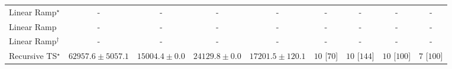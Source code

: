 \begin{tabular}{l|cccc|cccc|}
Linear Ramp$^\star$ & {\cellcolor[HTML]{000000}} \color[HTML]{F1F1F1} {\cellcolor{white}} \color{black} - & {\cellcolor[HTML]{000000}} \color[HTML]{F1F1F1} {\cellcolor{white}} \color{black} - & {\cellcolor[HTML]{000000}} \color[HTML]{F1F1F1} {\cellcolor{white}} \color{black} - & {\cellcolor[HTML]{000000}} \color[HTML]{F1F1F1} {\cellcolor{white}} \color{black} - & {\cellcolor[HTML]{000000}} \color[HTML]{F1F1F1} {\cellcolor{white}} \color{black} - & {\cellcolor[HTML]{000000}} \color[HTML]{F1F1F1} {\cellcolor{white}} \color{black} - & {\cellcolor[HTML]{000000}} \color[HTML]{F1F1F1} {\cellcolor{white}} \color{black} - & {\cellcolor[HTML]{000000}} \color[HTML]{F1F1F1} {\cellcolor{white}} \color{black} - \\
Linear Ramp & {\cellcolor[HTML]{000000}} \color[HTML]{F1F1F1} {\cellcolor{white}} \color{black} - & {\cellcolor[HTML]{000000}} \color[HTML]{F1F1F1} {\cellcolor{white}} \color{black} - & {\cellcolor[HTML]{000000}} \color[HTML]{F1F1F1} {\cellcolor{white}} \color{black} - & {\cellcolor[HTML]{000000}} \color[HTML]{F1F1F1} {\cellcolor{white}} \color{black} - & {\cellcolor[HTML]{000000}} \color[HTML]{F1F1F1} {\cellcolor{white}} \color{black} - & {\cellcolor[HTML]{000000}} \color[HTML]{F1F1F1} {\cellcolor{white}} \color{black} - & {\cellcolor[HTML]{000000}} \color[HTML]{F1F1F1} {\cellcolor{white}} \color{black} - & {\cellcolor[HTML]{000000}} \color[HTML]{F1F1F1} {\cellcolor{white}} \color{black} - \\
Linear Ramp$^\dagger$ & {\cellcolor[HTML]{000000}} \color[HTML]{F1F1F1} {\cellcolor{white}} \color{black} - & {\cellcolor[HTML]{000000}} \color[HTML]{F1F1F1} {\cellcolor{white}} \color{black} - & {\cellcolor[HTML]{000000}} \color[HTML]{F1F1F1} {\cellcolor{white}} \color{black} - & {\cellcolor[HTML]{000000}} \color[HTML]{F1F1F1} {\cellcolor{white}} \color{black} - & {\cellcolor[HTML]{000000}} \color[HTML]{F1F1F1} {\cellcolor{white}} \color{black} - & {\cellcolor[HTML]{000000}} \color[HTML]{F1F1F1} {\cellcolor{white}} \color{black} - & {\cellcolor[HTML]{000000}} \color[HTML]{F1F1F1} {\cellcolor{white}} \color{black} - & {\cellcolor[HTML]{000000}} \color[HTML]{F1F1F1} {\cellcolor{white}} \color{black} - \\
Recursive TS$^\star$ & {\cellcolor[HTML]{036B38}} \color[HTML]{F1F1F1} $62957.6\pm 5057.1$ & {\cellcolor[HTML]{FDFED9}} \color[HTML]{000000} $15004.4\pm 0.0$ & {\cellcolor[HTML]{E7F6AD}} \color[HTML]{000000} $24129.8\pm 0.0$ & {\cellcolor[HTML]{FAFDCC}} \color[HTML]{000000} $17201.5\pm 120.1$ & {\cellcolor[HTML]{49006A}} \color[HTML]{F1F1F1} $10$ [$70$] & {\cellcolor[HTML]{49006A}} \color[HTML]{F1F1F1} $10$ [$144$] & {\cellcolor[HTML]{49006A}} \color[HTML]{F1F1F1} $10$ [$100$] & {\cellcolor[HTML]{CD238F}} \color[HTML]{F1F1F1} $7$ [$100$] \\

\end{tabular}

